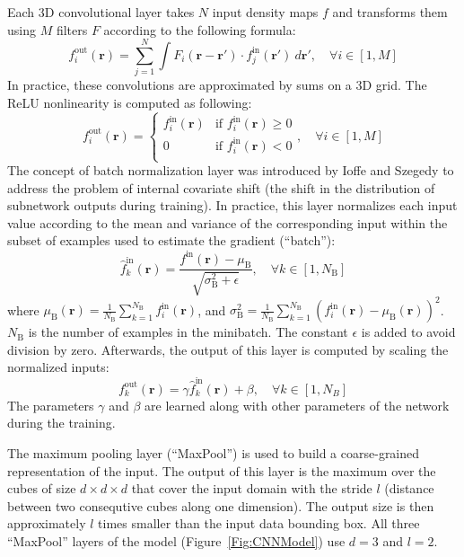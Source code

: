 \documentclass{bioinfo}
\begin{document}
Each 3D convolutional layer takes $N$ input density maps $f$ and
transforms them using $M$ filters $F$ according to the following
formula:
$$
f^\text{out}_i (\mathbf{r}) = \sum^{N}_{j=1} \int F_i (\mathbf{r} - \mathbf{r'}) \cdot f^\text{in}_j(\mathbf{r'}) ~d\mathbf{r'}, \quad\forall i \in [1,M]
$$
In practice, these convolutions are approximated by sums on a 3D grid.
The ReLU nonlinearity is computed as following:
$$
f^\text{out}_i (\mathbf{r}) = \begin{cases}
               f^\text{in}_i(\mathbf{r}) &\text{if } f^\text{in}_i(\mathbf{r})\geq 0\\
               0                         &\text{if } f^\text{in}_i(\mathbf{r})<0\\
            \end{cases}, \quad\forall i \in [1,M]
$$
The concept of batch normalization layer was introduced by Ioffe and
Szegedy \citep{ioffe2015batch} to address the problem of internal
covariate shift (the shift in the distribution of subnetwork outputs
during training). In practice, this layer normalizes each input value
according to the mean and variance of the corresponding input within
the subset of examples used to estimate the gradient (``batch''):
$$
\hat{f}^\text{in}_k(\mathbf{r}) = \frac{f^\text{in}(\mathbf{r}) - \mu_\text{B}}{\sqrt{\sigma^{2}_\text{B} + \epsilon}}, \quad\forall k \in [1,N_\text{B}]
$$
where $\mu_\text{B}(\mathbf{r})
= \frac{1}{N_\text{B}} \sum_{k=1}^{N_\text{B}}
f^\text{in}_i(\mathbf{r})$, and $\sigma^{2}_\text{B}
= \frac{1}{N_\text{B}} \sum_{k=1}^{N_\text{B}} \left(
f^\text{in}_i(\mathbf{r}) - \mu_\text{B}
(\mathbf{r}) \right)^2$. $N_\text{B}$ is the number of examples in the
minibatch. The constant $\epsilon$ is added to avoid division by
zero. Afterwards, the output of this layer is computed by scaling the
normalized inputs:
$$
f^\text{out}_k(\mathbf{r}) = \gamma \hat{f}^\text{in}_k(\mathbf{r}) + \beta, \quad\forall k \in [1,N_B]
$$
The parameters $\gamma$ and $\beta$ are learned along with other
parameters of the network during the training.

The maximum pooling layer (``MaxPool'') is used to build a
coarse-grained representation of the input. The output of this layer
is the maximum over the cubes of size $d \times d \times d$ that cover
the input domain with the stride $l$ (distance between two consequtive
cubes along one dimension).  The output size is then approximately $l$
times smaller than the input data bounding box.  All three ``MaxPool''
layers of the model (Figure~\ref{Fig:CNNModel}) use $d=3$ and $l=2$.
\end{document}
